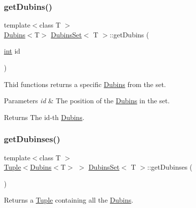 \subsubsection{\texorpdfstring{getDubins()}{getDubins()}}
{\footnotesize\ttfamily template$<$class T $>$ \\
\mbox{\hyperlink{class_dubins}{Dubins}}$<$T$>$ \mbox{\hyperlink{class_dubins_set}{Dubins\+Set}}$<$ T $>$\+::get\+Dubins (\begin{DoxyParamCaption}\item[{\mbox{\hyperlink{draw_8hh_aa620a13339ac3a1177c86edc549fda9b}{int}}}]{id }\end{DoxyParamCaption})\hspace{0.3cm}{\ttfamily [inline]}}

Thid functions returns a specific {\ttfamily \mbox{\hyperlink{class_dubins}{Dubins}}} from the set. 
\begin{DoxyParams}{Parameters}
{\em id} & The position of the {\ttfamily \mbox{\hyperlink{class_dubins}{Dubins}}} in the set. \\
\hline
\end{DoxyParams}
\begin{DoxyReturn}{Returns}
The id-\/th {\ttfamily \mbox{\hyperlink{class_dubins}{Dubins}}}. 
\end{DoxyReturn}
\mbox{\label{class_dubins_set_a2d0216573331d2ca6bf36ea213c4d434}} 
\subsubsection{\texorpdfstring{getDubinses()}{getDubinses()}}
{\footnotesize\ttfamily template$<$class T $>$ \\
\mbox{\hyperlink{class_tuple}{Tuple}}$<$\mbox{\hyperlink{class_dubins}{Dubins}}$<$T$>$ $>$ \mbox{\hyperlink{class_dubins_set}{Dubins\+Set}}$<$ T $>$\+::get\+Dubinses (\begin{DoxyParamCaption}{ }\end{DoxyParamCaption})\hspace{0.3cm}{\ttfamily [inline]}}



Returns a {\ttfamily \mbox{\hyperlink{class_tuple}{Tuple}}} containing all the {\ttfamily \mbox{\hyperlink{class_dubins}{Dubins}}}. 

\mbox{\label{class_dubins_set_af97fa42a6a9a6325c4d1ed4541758272}} 
